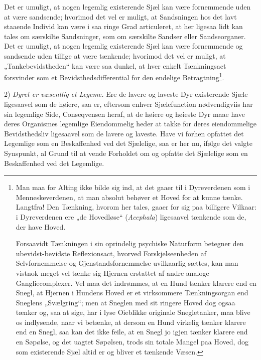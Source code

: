 \documentclass[11pt]{book}
\newcommand{\opage}[1]{\marginnote{\footnotesize\textit{[#1]}}}
\begin{document}
\opage{382} \setcounter{footnote}{0}%
Det er umuligt, at nogen legemlig existerende Sjæl kan være
fornemmende uden at være sandsende; hvorimod det vel er muligt, at
Sandsningen hos det lavt staaende Individ kan være i saa ringe Grad
articuleret, at her ligesaa lidt kan tales om særskilte Sandsninger,
som om særskilte Sandser eller Sandseorganer. Det er umuligt, at
nogen legemlig existerende Sjæl kan være fornemmende og sandsende
uden tillige at være tænkende; hvorimod det vel er muligt, at
„Tankebevidstheden“ kan være saa dunkel, at hver enkelt Tænkningsact
forsvinder som et Bevidsthedsdifferential for den endelige
Betragtning\footnote{Man maa for Alting ikke bilde sig ind, at det
gaaer til i Dyreverdenen som i Menneskeverdenen, at man absolut
behøver et Hoved for at kunne tænke. Langtfra! Den Tænkning, hvorom
her tales, gaaer for sig paa billigere Vilkaar: i Dyreverdenen ere
„de Hovedløse“ (\textit{Acephala}) ligesaavel tænkende som de, der
have Hoved.\par
Forsaavidt Tænkningen i sin oprindelig psychiske Naturform betegner
den ubevidst-bevidste Reflexionsact, hvorved Forskjelseenheden af
Selvfornemmelse og Gjenstandsfornemmelse uvilkaarlig sættes, kan man
vistnok meget vel tænke sig Hjernen erstattet af andre analoge
Gangliecomplexer. Vel maa det indrømmes, at en Hund tænker klarere
end en Snegl, at Hjernen i Hundens Hoved er et virksommere
Tænkningsorgan end Sneglens „Svælgring“; men at Sneglen med sit
ringere Hoved dog ogsaa tænker og, saa at sige, har i lyse Oieblikke
originale Snegletanker, maa blive os indlysende, naar vi betænke, at
dersom en Hund virkelig tænker klarere end en Snegl, saa kan det ikke
feile, at en Snegl jo igjen tænker klarere end en Søpølse, og det
uagtet Søpølsen, trods sin totale Mangel paa Hoved, dog som
existerende Sjæl altid er og bliver et tænkende Væsen.}.

2) \emph{Dyret er væsentlig et Legeme.} Ere de lavere og laveste Dyr
existerende Sjæle ligesaavel som de høiere, saa er, eftersom enhver
Sjælefunction nødvendigviis har sin legemlige Side, Conseqvensen
heraf, at de høiere og høieste Dyr maae have deres Organismes
legemlige Eiendommelig\-%
\opage{383} \setcounter{footnote}{0}%
heder at takke for deres eiendommelige Bevidsthedsliv ligesaavel som
de lavere og laveste. Have vi forhen opfattet det Legemlige som en
Beskaffenhed ved det Sjælelige, saa er her nu, ifølge det valgte
Synspunkt, al Grund til at vende Forholdet om og opfatte det
Sjælelige som en Beskaffenhed ved det Legemlige.
\end{document}
